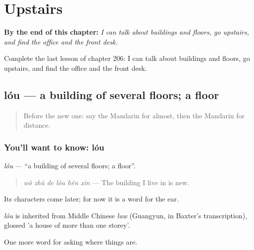 
\chapter{Upstairs}
\label{ch:zh-upstairs}

\begin{chapteropening}
\textbf{By the end of this chapter:} \emph{I can talk about buildings and floors, go upstairs, and find the office and the front desk.}

Complete the last lesson of chapter 206: I can talk about buildings and floors, go upstairs, and find the office and the front desk.
\end{chapteropening}

\section[lóu]{lóu — a building of several floors; a floor}

\label{lesson:ZH-C206-lou}



\begin{quote}
Before the new one: say the Mandarin for almost, then the Mandarin for distance.
\end{quote}

\subsection*{You'll want to know: lóu}
\emph{lóu} — \textquotedblleft{}a building of several floors; a floor\textquotedblright{}.

\begin{quote}
\emph{wǒ zhù de lóu hěn xīn} — The building I live in is new.
\end{quote}

Its characters come later; for now it is a word for the ear.

\begin{cousinweb}
\emph{lóu} is inherited from Middle Chinese \emph{luw} (Guangyun, in Baxter's transcription), glossed 'a house of more than one storey'.
\end{cousinweb}

\begin{grammarlens}[title={What you've built}]
One more word for asking where things are.
\end{grammarlens}

